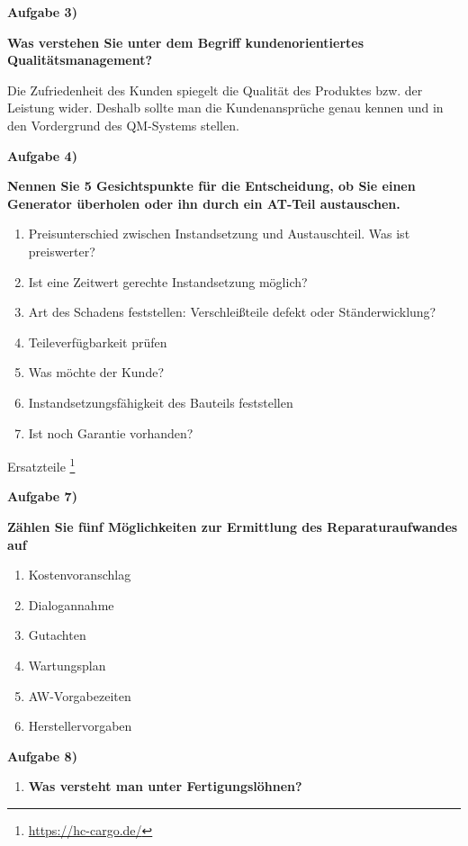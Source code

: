 \textbf{Aufgabe 3)}

\textbf{Was verstehen Sie unter dem Begriff kundenorientiertes
Qualitätsmanagement?}

Die Zufriedenheit des Kunden spiegelt die Qualität des Produktes bzw.
der Leistung wider. Deshalb sollte man die Kundenansprüche genau kennen
und in den Vordergrund des QM-Systems stellen.

\textbf{Aufgabe 4)}

\textbf{Nennen Sie 5 Gesichtspunkte für die Entscheidung, ob Sie einen
Generator überholen oder ihn durch ein AT-Teil austauschen.}

\begin{enumerate}
\item
  Preisunterschied zwischen Instandsetzung und Austauschteil. Was ist
  preiswerter?
\item
  Ist eine Zeitwert gerechte Instandsetzung möglich?
\item
  Art des Schadens feststellen: Verschleißteile defekt oder
  Ständerwicklung?
\item
  Teileverfügbarkeit prüfen
\item
  Was möchte der Kunde?
\item
  Instandsetzungsfähigkeit des Bauteils feststellen
\item
  Ist noch Garantie vorhanden?
\end{enumerate}

Ersatzteile \footnote{\url{https://hc-cargo.de/}}

\textbf{Aufgabe 7)}

\textbf{Zählen Sie fünf Möglichkeiten zur Ermittlung des
Reparaturaufwandes auf}

\begin{enumerate}
\item
  Kostenvoranschlag
\item
  Dialogannahme
\item
  Gutachten
\item
  Wartungsplan
\item
  AW-Vorgabezeiten
\item
  Herstellervorgaben
\end{enumerate}

\textbf{Aufgabe 8)}

\begin{enumerate}
\item
  \textbf{Was versteht man unter Fertigungslöhnen?}
\end{enumerate}


